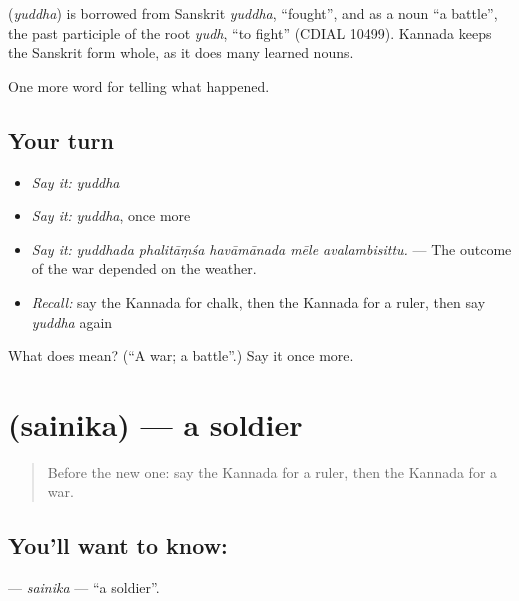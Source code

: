 \begin{cousinweb}
\textbf{} (\emph{yuddha}) is borrowed from Sanskrit \emph{yuddha}, \textquotedblleft{}fought\textquotedblright{}, and as a noun \textquotedblleft{}a battle\textquotedblright{}, the past participle of the root \emph{yudh}, \textquotedblleft{}to fight\textquotedblright{} (CDIAL 10499). Kannada keeps the Sanskrit form whole, as it does many learned nouns.
\end{cousinweb}

\begin{grammarlens}[title={What you've built}]
One more word for telling what happened.
\end{grammarlens}

\subsection*{Your turn}
\begin{itemize}
\raggedright
  \item \emph{Say it:} \emph{yuddha}
  \item \emph{Say it:} \emph{yuddha}, once more
  \item \emph{Say it:} \emph{yuddhada phalitāṃśa havāmānada mēle avalambisittu.} — The outcome of the war depended on the weather.
  \item \emph{Recall:} say the Kannada for chalk, then the Kannada for a ruler, then say \emph{yuddha} again
\end{itemize}

\begin{tcolorbox}[breakable,colback=teal!4,colframe=teal!35!black,title={Before you move on}]
What does  mean? (\textquotedblleft{}A war; a battle\textquotedblright{}.) Say it once more.
\end{tcolorbox}
\section[\texorpdfstring{\kn{ಸೈನಿಕ} (sainika)}{ಸೈನಿಕ (sainika)}]{ (sainika) — a soldier}

\label{lesson:KA-C319-sainika}



\begin{quote}
Before the new one: say the Kannada for a ruler, then the Kannada for a war.
\end{quote}

\subsection*{You'll want to know: }
\textbf{} — \emph{sainika} — \textquotedblleft{}a soldier\textquotedblright{}.

